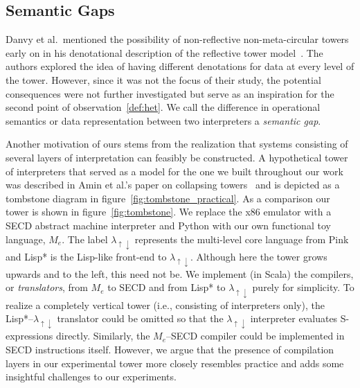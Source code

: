 \documentclass[sigplan,anonymous,review]{acmart}
\newcommand{\mslang}{$\lambda_{\uparrow\downarrow}$}
\newcommand{\mevl}{$M_{e}$}
\theoremstyle{definition}
\newcommand{\note}[1]{{\color{red}[#1]}}
\newcommand{\todo}[1]{\note{TODO: #1}}
\begin{document}
\subsection{Semantic Gaps}
Danvy et al.~mentioned the possibility of non-reflective non-meta-circular towers early on in his denotational description of the reflective tower model~\cite{danvy1988intensions}. The authors explored the idea of having different denotations for data at every level of the tower. However, since it was not the focus of their study, the potential consequences were not further investigated but serve as an inspiration for the second point of observation~\ref{def:het}. We call the difference in operational semantics or data representation between two interpreters a \textit{semantic gap}.

Another motivation of ours stems from the realization that systems consisting of several layers of interpretation can feasibly be constructed. A hypothetical tower of interpreters that served as a model for the one we built throughout our work was described in Amin et al.'s paper on collapsing towers~\cite{amin2017collapsing} and is depicted as a tombstone diagram in figure~\ref{fig:tombstone_practical}. As a comparison our tower is shown in figure~\ref{fig:tombstone}. We replace the x86 emulator with a SECD abstract machine interpreter and Python with our own functional toy language, \mevl. The label \mslang{} represents the multi-level core language from Pink~\cite{amin2017collapsing} and Lisp* is the Lisp-like front-end to \mslang. Although here the tower grows upwards and to the left, this need not be. We implement (in Scala) the compilers, or \textit{translators}, from \mevl{} to SECD and from Lisp* to \mslang{} purely for simplicity. To realize a completely vertical tower (i.e., consisting of interpreters only), the Lisp*--\mslang{} translator could be omitted so that the \mslang{} interpreter evaluates S-expressions directly. Similarly, the \mevl--SECD compiler could be implemented in SECD instructions itself. However, we argue that the presence of compilation layers in our experimental tower more closely resembles practice and adds some insightful challenges to our experiments.

\end{document}
